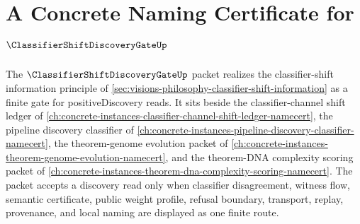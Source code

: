 \chapter{A Concrete Naming Certificate for $\ClassifierShiftDiscoveryGateUp$}
\label{ch:concrete-instances-classifier-shift-discovery-gate-namecert}

The $\ClassifierShiftDiscoveryGateUp$ packet realizes the classifier-shift information principle of \autoref{sec:visions-philosophy-classifier-shift-information} as a finite gate for positiveDiscovery reads. It sits beside the classifier-channel shift ledger of \autoref{ch:concrete-instances-classifier-channel-shift-ledger-namecert}, the pipeline discovery classifier of \autoref{ch:concrete-instances-pipeline-discovery-classifier-namecert}, the theorem-genome evolution packet of \autoref{ch:concrete-instances-theorem-genome-evolution-namecert}, and the theorem-DNA complexity scoring packet of \autoref{ch:concrete-instances-theorem-dna-complexity-scoring-namecert}. The packet accepts a discovery read only when classifier disagreement, witness flow, semantic certificate, public weight profile, refusal boundary, transport, replay, provenance, and local naming are displayed as one finite route.

